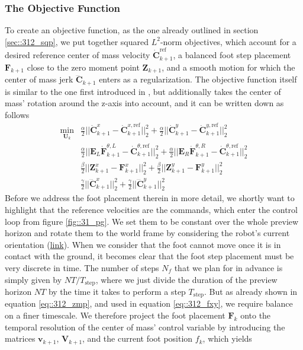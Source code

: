 \subsubsection{The Objective Function}
To create an objective function, as the one already outlined in section \ref{sec::312_sqp}, we put together squared $L^2$-norm objectives, which account for a desired reference center of mass velocity $\dot{\bm{C}}_{k+1}^\text{ref}$, a balanced foot step placement $\textbf{F}_{k+1}$ close to the zero moment point $\bm{Z}_{k+1}$, and a smooth motion for which the center of mass jerk $\dddot{\bm{C}}_{k+1}$ enters as a regularization. The objective function itself is similar to the one first introduced in \cite{herdt2010online}, but additionally takes the center of mass' rotation around the z-axis into account, and it can be written down as follows
\begin{align}
	\min_{\bm{U}_k} &\frac{\alpha}{2}||\dot{\bm{C}}^x_{k+1} - \dot{\bm{C}}_{k+1}^{x,\text{ref}}||_2^2 + \frac{\alpha}{2}||\dot{\bm{C}}^y_{k+1} - \dot{\bm{C}}_{k+1}^{y,\text{ref}}||_2^2 
	\label{eq::312_dcxy}\\
	&\frac{\alpha}{2}||\bm{E}_L\dot{\bm{F}}^{\theta,L}_{k+1} - \dot{\bm{C}}_{k+1}^{\theta,\text{ref}}||_2^2 + 	\frac{\alpha}{2}||\bm{E}_R\dot{\bm{F}}^{\theta,R}_{k+1} - \dot{\bm{C}}_{k+1}^{\theta,\text{ref}}||_2^2 
	\label{eq::312_dftheta} \\
	&\frac{\beta}{2}||\bm{Z}^x_{k+1}-\bm{F}^x_{k+1}||^2_2 + \frac{\beta}{2}||\bm{Z}^y_{k+1}-\bm{F}^y_{k+1}||^2_2 
	\label{eq::312_fxy}\\
	&\frac{\gamma}{2}||\dddot{\bm{C}}_{k+1}^x||^2_2 + \frac{\gamma}{2}||\dddot{\bm{C}}_{k+1}^y||^2_2	
	\label{eq::312_dddcxy}
\end{align}
Before we address the foot placement therein in more detail, we shortly want to highlight that the reference velocities are the commands, which enter the control loop from figure \ref{fig::31_pg}. We set them to be constant over the whole preview horizon and rotate them to the world frame  by considering the robot's current orientation (\href{https://github.com/mhubii/nmpc_pattern_generator/blob/5a213044c927dc6aac9f7e32ce1e5fb472cd67bb/libs/pattern_generator/src/base_generator.cpp#L324}{link}). When we consider that the foot cannot move once it is in contact with the ground, it becomes clear that the foot step placement must be very discrete in time. The number of steps $N_f$ that we plan for in advance is simply given by $NT/T_\text{step}$, where we just divide the duration of the preview horizon $NT$ by the time it takes to perform a step $T_\text{step}$. But as already shown in equation \ref{eq::312_zmp}, and used in equation \ref{eq::312_fxy}, we require balance on a finer timescale. We therefore project the foot placement $\bm{F}_k$ onto the temporal resolution of the center of mass' control variable by introducing the matrices $\bm{v}_{k+1}$, $\bm{V}_{k+1}$, and the current foot position $f_k$, which yields
